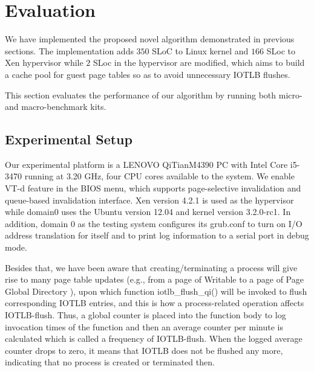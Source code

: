 
\section{Evaluation} \label{sec:eva}

We have implemented the proposed novel algorithm demonstrated in previous sections. The implementation adds $350$ SLoC to Linux kernel and $166$ SLoc to Xen hypervisor while $2$ SLoc in the hypervisor are modified, which aims to build a cache pool for guest page tables so as to avoid unnecessary IOTLB flushes.

This section evaluates the performance of our algorithm by running both micro- and macro-benchmark kits.

\subsection{Experimental Setup}

Our experimental platform is a LENOVO QiTianM4390 PC with Intel Core i5-3470 running at 3.20 GHz, four CPU cores available to the system. We enable VT-d feature in the BIOS menu, which supports page-selective invalidation and queue-based invalidation interface. Xen version 4.2.1 is used as the hypervisor while domain0 uses the Ubuntu version 12.04 and kernel version 3.2.0-rc1. In addition, domain 0 as the testing system configures its grub.conf to turn on I/O address translation for itself and to print log information to a serial port in debug mode.

Besides that, we have been aware that creating/terminating a process will give rise to many page table updates (e.g., from a page of Writable to a page of Page Global Directory ), upon which function iotlb\_flush\_qi() will be invoked to flush corresponding IOTLB entries, and this is how a process-related operation affects IOTLB-flush. Thus, a global counter is placed into the function body to log invocation times of the function and then an average counter per minute is calculated which is called a frequency of IOTLB-flush. When the logged average counter drops to zero, it means that IOTLB does not be flushed any more, indicating that no process is created or terminated then.

